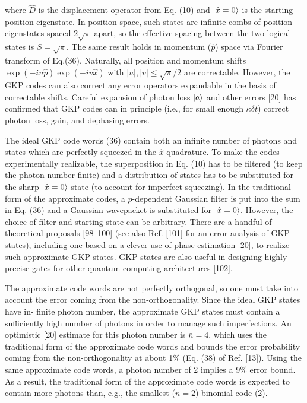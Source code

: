 \documentclass[12]{amsart}
\newcommand\0{\mathbf{0}}
\newcommand\<{\langle}
\renewcommand\>{\rangle}
\begin{document}
  where $\hat{D}$ is the displacement operator from Eq. (10) and $\ket{\hat{x} = 0}$ is the starting position eigenstate. In position space, such states are infinite combs of position eigenstates spaced $2\sqrt{\pi}$ apart, so the effective spacing between the two logical states is $S=\sqrt{\pi}$. The same result holds in momentum ($\hat{p}$) space via Fourier transform of Eq.(36). Naturally, all position and momentum shifts $\exp(-iu\hat{p})\exp(-iv\hat{x})$ with $|u|, |v| \leq \sqrt{\pi}/2$ are correctable. However, the GKP codes can also correct any error operators expandable in the basis of correctable shifts. Careful expansion of photon loss $\ket{a}$ and other errors [20] has confirmed that GKP codes can in principle (i.e., for small enough $\kappa \delta t$) correct photon loss, gain, and dephasing errors.
  
The ideal GKP code words (36) contain both an infinite number of photons and states which are perfectly squeezed in the $\hat{x}$ quadrature. To make the codes experimentally realizable, the superposition in Eq. (10) has to be filtered (to keep the photon number finite) and a distribution of states has to be substituted for the sharp $\ket{\hat{x}=0}$ state (to account for imperfect squeezing). In the traditional form of the approximate codes, a $p$-dependent Gaussian filter is put into the sum in Eq. (36) and a Gaussian wavepacket is substituted for $\ket{\hat{x}=0}$. However, the choice of filter and starting state can be arbitrary. There are a handful of theoretical proposals [98–100] (see also Ref. [101] for an error analysis of GKP states), including one based on a clever use of phase estimation [20], to realize such approximate GKP states. GKP states are also useful in designing highly precise gates for other quantum computing architectures [102].

The approximate code words are not perfectly orthogonal, so one must take into account the error coming from the non-orthogonality. Since the ideal GKP states have in- finite photon number, the approximate GKP states must contain a sufficiently high number of photons in order to manage such imperfections. An optimistic [20] estimate for this photon number is $\bar{n} = 4$, which uses the traditional form of the approximate code words and bounds the error probability coming from the non-orthogonality at about 1\% (Eq. (38) of Ref. [13]). Using the same approximate code words, a photon number of 2 implies a 9\% error bound. As a result, the traditional form of the approximate code words is expected to contain more photons than, e.g., the smallest ($\bar{n} = 2$) binomial code (2).
\end{document}
